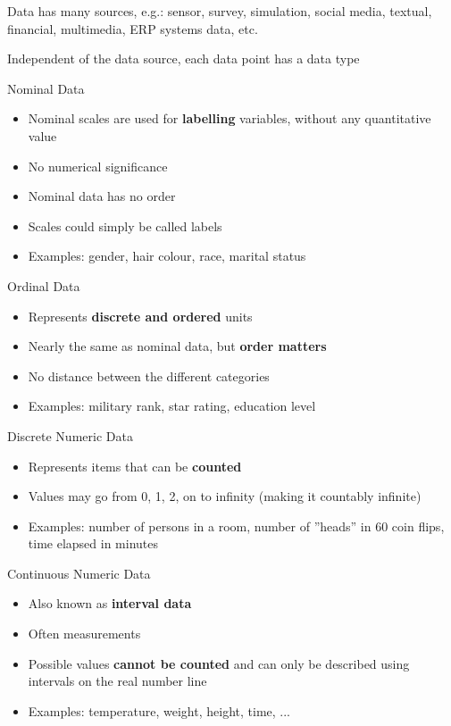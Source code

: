 \begin{definition}{Data} has many sources, e.g.: 
    sensor, survey, simulation, social media, textual, financial, multimedia, ERP systems data, etc.
    
    Independent of the data source, each data point has a data type
\end{definition}

\begin{corollary}{Nominal Data}
    \begin{itemize}
        \item Nominal scales are used for \textbf{labelling} variables, without any quantitative value
        \item No numerical significance
        \item Nominal data has no order
        \item Scales could simply be called labels
        \item Examples: gender, hair colour, race, marital status
    \end{itemize}
\end{corollary}

\begin{corollary}{Ordinal Data}
    \begin{itemize}
        \item Represents \textbf{discrete and ordered} units
        \item Nearly the same as nominal data, but \textbf{order matters}
        \item No distance between the different categories
        \item Examples: military rank, star rating, education level
    \end{itemize}
\end{corollary}

\begin{corollary}{Discrete Numeric Data}
    \begin{itemize}
        \item Represents items that can be \textbf{counted}
        \item Values may go from 0, 1, 2, on to infinity (making it countably infinite)
        \item Examples: number of persons in a room, number of ''heads'' in 60 coin flips, time elapsed in minutes
    \end{itemize}
\end{corollary}

\begin{corollary}{Continuous Numeric Data}
    \begin{itemize}
        \item Also known as \textbf{interval data}
        \item Often measurements
        \item Possible values \textbf{cannot be counted} and can only be described using intervals on the real number line
        \item Examples: temperature, weight, height, time, ...
    \end{itemize}
\end{corollary}

